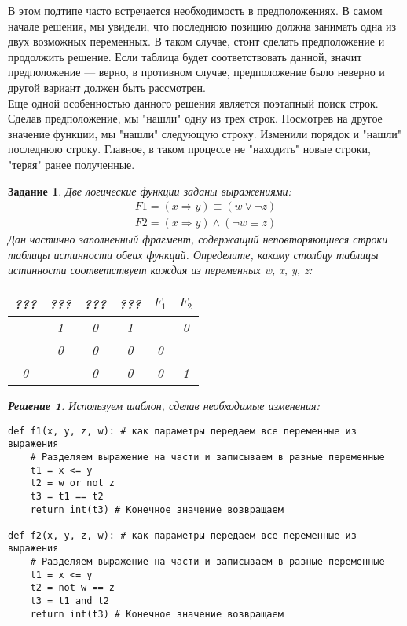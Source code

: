 \documentclass[12pt]{article}
\theoremstyle{problem_style}
\newtheorem{problem}{Задание}[subsection]
\newtheorem{solution}{Решение}[subsection]
\begin{document}
В этом подтипе часто встречается необходимость в предположениях. В самом начале решения, мы увидели, что последнюю позицию должна занимать одна из двух возможных переменных. В таком случае, стоит сделать предположение и продолжить решение. Если таблица будет соответствовать данной, значит предположение — верно, в противном случае, предположение было неверно и другой вариант должен быть рассмотрен.\\
Еще одной особенностью данного решения является поэтапный поиск строк. Сделав предположение, мы "нашли" одну из трех строк. Посмотрев на другое значение функции, мы "нашли" следующую строку. Изменили порядок и "нашли" последнюю строку. Главное, в таком процессе не "находить" новые строки, "теряя" ранее полученные.

\begin{problem}
Две логические функции заданы выражениями:
\begin{gather*}
F1 = (x \Rightarrow y) \equiv (w \lor \neg z)\\
F2 = (x \Rightarrow y) \land (\neg w \equiv z)
\end{gather*}
Дан частично заполненный фрагмент, содержащий неповторяющиеся строки таблицы истинности обеих функций. Определите, какому столбцу таблицы истинности соответствует каждая из переменных w, x, y, z:
\begin{table}[h]
    \centering
    \begin{tabular}{|c|c|c|c||c|c|}
        \hline
        ??? & ??? & ??? & ??? & $F_1$ & $F_2$ \\
        \hline
         & 1 & 0 & 1 &  & 0 \\
        \hline
         & 0 & 0 & 0 & 0 &  \\
        \hline
        0 &  & 0 & 0 & 0 & 1 \\
        \hline
    \end{tabular}
\end{table}
\begin{solution}
Используем шаблон, сделав необходимые изменения:
\begin{verbatim}
def f1(x, y, z, w): # как параметры передаем все переменные из выражения
    # Разделяем выражение на части и записываем в разные переменные
    t1 = x <= y
    t2 = w or not z
    t3 = t1 == t2
    return int(t3) # Конечное значение возвращаем

def f2(x, y, z, w): # как параметры передаем все переменные из выражения
    # Разделяем выражение на части и записываем в разные переменные
    t1 = x <= y
    t2 = not w == z
    t3 = t1 and t2
    return int(t3) # Конечное значение возвращаем


\end{verbatim}
\end{solution}
\end{problem}
\end{document}
